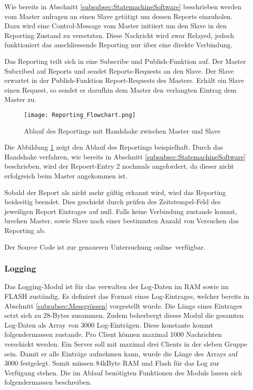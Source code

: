 Wie bereits in Abschnitt \ref{subsubsec:StatemachineSoftware} beschrieben werden vom Master anfragen an einen Slave getätigt um dessen Reports einzuholen. Dazu wird eine Control-Message vom Master initiiert um den Slave in den Reporting Zustand zu versetzten. Diese Nachricht wird zwar Relayed, jedoch funktioniert das anschliessende Reporting nur über eine direkte Verbindung.

Das Reporting teilt sich in eine Subscribe und Publish-Funktion auf. Der Master Subcribed auf Reports und sendet Reports-Requests an den Slave. Der Slave erwartet in der Publish-Funktion Report-Requests des Masters. Erhält ein Slave einen Request, so sendet er darufhin dem Master den verlangten Eintrag dem Master zu.

\begin{figure}[H]
	\centering
	\texttt{[image: Reporting\_Flowchart.png]}
	\caption{Ablauf des Reportings mit Handshake zwischen Master und Slave}\label{fig:ReportingAblauf}
\end{figure}

Die Abbildung \ref{fig:ReportingAblauf} zeigt den Ablauf des Reportings beispielhaft. Durch das Handshake verfahren, wie bereits in Abschnitt \ref{subsubsec:StatemachineSoftware} beschrieben, wird der Repoert-Entry 2 nochmals angefordert, da dieser nicht erfolgreich beim Master angekommen ist.

Sobald der Report als nicht mehr gültig erkannt wird, wird das Reporting beidseitig beendet. Dies geschieht durch prüfen des Zeitstempel-Feld des jeweiligen Report Eintrages auf null. Falls keine Verbindung zustande kommt, brechen Master, sowie Slave nach einer bestimmten Anzahl von Versuchen das Reporting ab.

Der Source Code ist zur genaueren Untersuchung online\footnotemark\ verfügbar. 


\subsubsection{Logging}\label{subsubsec:Logging}

Das Logging-Modul ist für das verwalten der Log-Daten im RAM sowie im FLASH zuständig. Es definiert das Format eines Log-Eintrages, welcher bereits in Abschnitt \ref{subsubsec:Messgrössen} vorgestellt wurde. Die Länge eines Eintrages setzt sich zu 28-Bytes zusammen. Zudem beherbergt dieses Modul die gesamten Log-Daten als Array von 3000 Log-Einträgen. Diese konstante kommt folgendermassen zustande. Pro Client können maximal 1000 Nachrichten verschickt werden. Ein Server soll mit maximal drei Clients in der sleben Gruppe sein. Damit er alle Einträge aufnehmen kann, wurde die Länge des Arrays auf 3000 festgelegt. Somit müssen 84kByte RAM und Flash für das Log zur Verfügung stehen. Die im Ablauf benötigten Funktionen des Moduls lassen sich folgendermassen beschreiben. 

